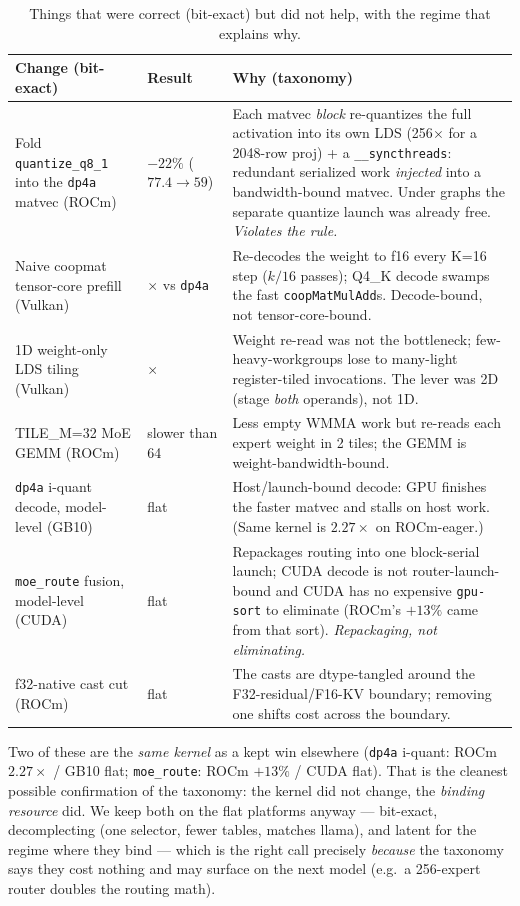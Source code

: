 \documentclass[11pt]{article}
\newcommand{\x}{\ensuremath{\times}}
\newcommand{\dpa}{\texttt{dp4a}}
\begin{document}
\begin{table}[h]
\centering
\caption{Things that were correct (bit-exact) but did not help, with the regime that explains why.}
\small
\begin{tabular}{>{\raggedright\arraybackslash}p{3.9cm} >{\raggedright\arraybackslash}p{2.2cm} >{\raggedright\arraybackslash}p{6.7cm}}
\toprule
Change (bit-exact) & Result & Why (taxonomy) \\
\midrule
Fold \texttt{quantize\_q8\_1} into the \dpa{} matvec (ROCm) & \textbf{$-22\%$} ($77.4\to59$) & Each matvec \emph{block} re-quantizes the full activation into its own LDS (256$\times$ for a 2048-row proj) + a \texttt{\_\_syncthreads}: redundant serialized work \emph{injected} into a bandwidth-bound matvec. Under graphs the separate quantize launch was already free. \emph{Violates the rule.} \\
Naive coopmat tensor-core prefill (Vulkan) & 0.26\x{} vs \dpa{} & Re-decodes the weight to f16 every K=16 step ($k/16$ passes); Q4\_K decode swamps the fast \texttt{coopMatMulAdd}s. Decode-bound, not tensor-core-bound. \\
1D weight-only LDS tiling (Vulkan) & 0.21\x & Weight re-read was not the bottleneck; few-heavy-workgroups lose to many-light register-tiled invocations. The lever was 2D (stage \emph{both} operands), not 1D. \\
TILE\_M=32 MoE GEMM (ROCm) & slower than 64 & Less empty WMMA work but re-reads each expert weight in 2 tiles; the GEMM is weight-bandwidth-bound. \\
\dpa{} i-quant decode, model-level (GB10) & flat & Host/launch-bound decode: GPU finishes the faster matvec and stalls on host work. (Same kernel is $2.27\x$ on ROCm-eager.) \\
\texttt{moe\_route} fusion, model-level (CUDA) & flat & Repackages routing into one block-serial launch; CUDA decode is not router-launch-bound and CUDA has no expensive \texttt{gpu-sort} to eliminate (ROCm's $+13\%$ came from that sort). \emph{Repackaging, not eliminating.} \\
f32-native cast cut (ROCm) & flat & The casts are dtype-tangled around the F32-residual/F16-KV boundary; removing one shifts cost across the boundary. \\
\bottomrule
\end{tabular}
\end{table}

\noindent Two of these are the \emph{same kernel} as a kept win elsewhere (\dpa{} i-quant: ROCm
$2.27\x$ / GB10 flat; \texttt{moe\_route}: ROCm $+13\%$ / CUDA flat). That is the cleanest possible
confirmation of the taxonomy: the kernel did not change, the \emph{binding resource} did. We keep
both on the flat platforms anyway --- bit-exact, decomplecting (one selector, fewer tables, matches
llama), and latent for the regime where they bind --- which is the right call precisely \emph{because}
the taxonomy says they cost nothing and may surface on the next model (e.g.\ a 256-expert router
doubles the routing math).
\end{document}
